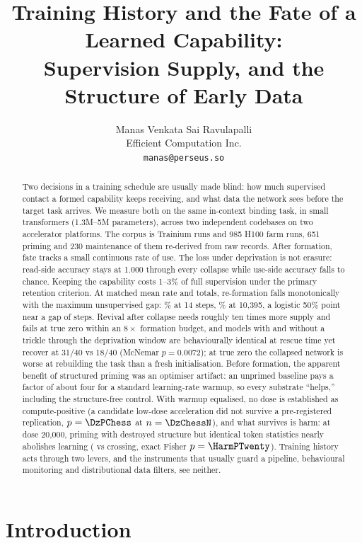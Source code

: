\documentclass{article}
\title{Training History and the Fate of a Learned Capability:\\
Supervision Supply, and the Structure of Early Data}
\author{%
  Manas Venkata Sai Ravulapalli\\
  Efficient Computation Inc.\\
  \texttt{manas@perseus.so}
}
\begin{document}
\maketitle

\begin{abstract}
Two decisions in a training schedule are usually made blind: how much supervised contact a
formed capability keeps receiving, and what data the network sees before the target task
arrives. We measure both on the same in-context binding task, in small transformers
(1.3M--5M parameters), across two independent codebases on two accelerator platforms. The
corpus is \DevaxisRuns{} Trainium runs and 985 H100 farm runs, 651 priming and 230
maintenance of them re-derived from raw records. After formation, fate tracks a small
continuous rate of use. The loss under deprivation is not erasure: read-side accuracy stays
at 1.000 through every collapse while use-side accuracy falls to chance. Keeping the
capability costs 1--3\% of full supervision under the primary retention criterion. At
matched mean rate and totals, re-formation falls monotonically with the maximum unsupervised
gap: \GapCellUniformPct\% at 14 steps, \GapCellBlocksPct\% at 10{,}395, a logistic 50\%
point near a gap of \GapFifty{} steps. Revival after collapse
needs roughly ten times more supply and fails at true zero within an $8\times$ formation
budget, and models with and without a trickle through the deprivation window are
behaviourally identical at
rescue time yet recover at 31/40 vs 18/40 (McNemar $p=0.0072$); at true zero the collapsed
network is worse at rebuilding the task than a fresh initialisation. Before formation, the
apparent benefit of structured priming was an optimiser artifact: an unprimed baseline pays
a factor of about four for a standard learning-rate warmup, so every substrate ``helps,''
including the structure-free control. With warmup equalised, no dose is established as
compute-positive (a candidate low-dose acceleration did not survive a pre-registered
replication, $p=\DzPChess$ at $n=\DzChessN$), and what survives is harm: at dose 20{,}000,
priming with destroyed structure but identical token statistics nearly abolishes learning
(\HarmShufTwenty{} vs \HarmChessTwenty{} crossing, exact Fisher $p=\HarmPTwenty$). Training
history acts through two levers, and the instruments that usually guard a pipeline,
behavioural monitoring and distributional data filters, see neither.
\end{abstract}

\section{Introduction}
\end{document}
